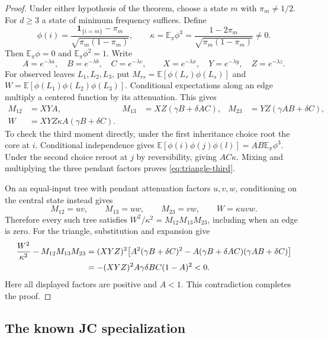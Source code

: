 \documentclass[11pt]{article}
\theoremstyle{definition}
\theoremstyle{remark}
\newcommand{\E}{\mathbb E}
\begin{document}
\begin{proof}
Under either hypothesis of the theorem, choose a state $m$ with
$\pi_m\ne1/2$. For $d\ge3$ a state of minimum frequency suffices.
Define
\begin{equation}\label{eq:contrast}
 \phi(i)=\frac{\mathbf1_{\{i=m\}}-\pi_m}
                  {\sqrt{\pi_m(1-\pi_m)}},\qquad
 \kappa=\E_\pi\phi^3=
       \frac{1-2\pi_m}{\sqrt{\pi_m(1-\pi_m)}}\ne0.
\end{equation}
Then $\E_\pi\phi=0$ and $\E_\pi\phi^2=1$. Write
\[
 A=e^{-\lambda a},\quad B=e^{-\lambda b},\quad C=e^{-\lambda c},
 \qquad X=e^{-\lambda x},\quad Y=e^{-\lambda y},\quad Z=e^{-\lambda z}.
\]
For observed leaves $L_1,L_2,L_3$, put
$M_{rs}=\E[\phi(L_r)\phi(L_s)]$ and
$W=\E[\phi(L_1)\phi(L_2)\phi(L_3)]$.
Conditional expectations along an edge multiply a centered function by its
attenuation. This gives
\begin{align}
 M_{12}&=XYA, &
 M_{13}&=XZ(\gamma B+\delta AC), &
 M_{23}&=YZ(\gamma AB+\delta C),\label{eq:triangle-pairs}\\
 W&=XYZ\kappa A(\gamma B+\delta C).&&&\label{eq:triangle-third}
\end{align}
To check the third moment directly, under the first inheritance choice
root the core at $i$. Conditional independence gives
$\E[\phi(i)\phi(j)\phi(l)]=AB\E_\pi\phi^3$.
Under the second choice reroot at $j$ by reversibility, giving $AC\kappa$.
Mixing and multiplying the three pendant factors proves
\eqref{eq:triangle-third}.

On an equal-input tree with pendant attenuation factors $u,v,w$,
conditioning on the central state instead gives
\[
 M_{12}=uv,\qquad M_{13}=uw,\qquad M_{23}=vw,
 \qquad W=\kappa uvw.
\]
Therefore every such tree satisfies
$W^2/\kappa^2=M_{12}M_{13}M_{23}$, including when an edge is zero.
For the triangle, substitution and expansion give
\begin{align}
 \frac{W^2}{\kappa^2}-M_{12}M_{13}M_{23}
 &=(XYZ)^2\bigl[A^2(\gamma B+\delta C)^2
  -A(\gamma B+\delta AC)(\gamma AB+\delta C)\bigr]\notag\\
 &=-(XYZ)^2 A\gamma\delta BC(1-A)^2<0.\label{eq:defect}
\end{align}
Here all displayed factors are positive and $A<1$. This contradiction
completes the proof.
\end{proof}

\subsection{The known JC specialization}
\end{document}
